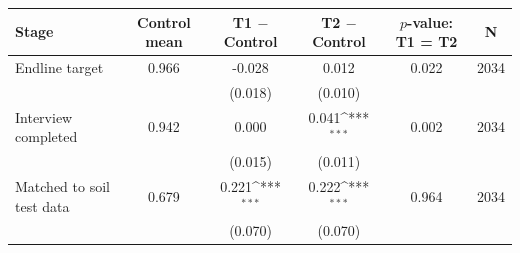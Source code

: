 {
\def\sym#1{\ifmmode^{#1}\else\(^{#1}\)\fi}
\begin{tabular}{lccccc}
\hline\hline
Stage & Control mean & T1 $-$ Control & T2 $-$ Control & $p$-value: T1 = T2 & N \\
\hline
Endline target & 0.966 & -0.028 & 0.012 & 0.022 & 2034 \\
 &  & (0.018) & (0.010) &  &  \\
Interview completed & 0.942 & 0.000 & 0.041\sym{***} & 0.002 & 2034 \\
 &  & (0.015) & (0.011) &  &  \\
Matched to soil test data & 0.679 & 0.221\sym{***} & 0.222\sym{***} & 0.964 & 2034 \\
 &  & (0.070) & (0.070) &  &  \\
\hline\hline
\end{tabular}
}
